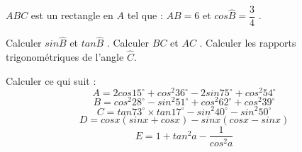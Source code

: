 \documentclass[a4paper,addpoints,12pt]{exam}
\begin{document}
\begin{exo}
$ABC$ est un rectangle en $A$ tel que : $AB=6$ et $cos\widehat{B}=\dfrac{3}{4}$ .
\begin{questions}
\question Calculer $sin\widehat{B}$ et $tan\widehat{B}$ .
\question Calculer  $BC$ et $AC$ .
\question Calculer les rapports trigonométriques de l'angle  $ \widehat{C}$.
\end{questions}
\end{exo}

\begin{exo}
\begin{questions}
\question Calculer ce qui suit :
$$A=2cos15^{\circ}+cos^{2}36^{\circ}-2sin75^{\circ}+cos^{2}54^{\circ}$$
$$B=cos^{2}28^{\circ}-sin^{2}51^{\circ}+cos^{2}62^{\circ}+cos^{2}39^{\circ} $$
$$C=tan73^{\circ}\times tan17^{\circ}-sin^{2}40^{\circ}-sin^{2}50^{\circ} $$
$$D=cosx(sinx+cosx)-sinx(cosx-sinx)  $$ 
$$E= 1+tan^{2}a-\dfrac{1}{cos^{2}a}$$
\end{questions}
\end{exo}
\end{document}
